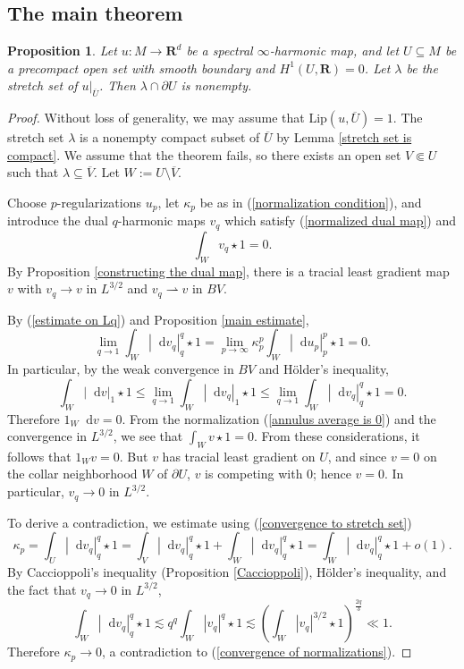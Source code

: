 \documentclass[reqno,11pt]{amsart}
\newcommand{\RR}{\mathbf{R}}
\newcommand*\dif{\mathop{}\!\mathrm{d}}
\newcommand{\Lip}{\mathrm{Lip}}
\newtheorem{proposition}[theorem]{Proposition}
\newcommand{\weakto}{\rightharpoonup}
\theoremstyle{definition}
\numberwithin{equation}{section}
\begin{document}
\subsection{The main theorem}
\begin{proposition}\label{main prop}
Let $u: M \to \RR^d$ be a spectral $\infty$-harmonic map, and let $U \subseteq M$ be a precompact open set with smooth boundary and $H^1(U, \RR) = 0$.
Let $\lambda$ be the stretch set of $u|_{\overline U}$.
Then $\lambda \cap \partial U$ is nonempty.
\end{proposition}
\begin{proof}
Without loss of generality, we may assume that $\Lip(u, \overline U) = 1$.
The stretch set $\lambda$ is a nonempty compact subset of $\overline U$ by Lemma \ref{stretch set is compact}.
We assume that the theorem fails, so there exists an open set $V \Subset U$ such that $\lambda \subseteq \overline V$.
Let $W := U \setminus \overline V$.

Choose $p$-regularizations $u_p$, let $\kappa_p$ be as in (\ref{normalization condition}), and introduce the dual $q$-harmonic maps $v_q$ which satisfy (\ref{normalized dual map}) and 
\begin{equation}\label{annulus average is 0}
\int_W v_q \star 1 = 0.
\end{equation}
By Proposition \ref{constructing the dual map}, there is a tracial least gradient map $v$ with $v_q \to v$ in $L^{3/2}$ and $v_q \weakto v$ in $BV$.

By (\ref{estimate on Lq}) and Proposition \ref{main estimate},
\begin{equation}\label{convergence to stretch set}
\lim_{q \to 1} \int_W |\dif v_q|_{q}^q \star 1 = \lim_{p \to \infty} \kappa_p^p \int_W |\dif u_p|_{p}^p \star 1 = 0.
\end{equation}
In particular, by the weak convergence in $BV$ and H\"older's inequality, 
$$\int_W |\dif v|_1 \star 1 \leq \lim_{q \to 1} \int_W |\dif v_q|_1 \star 1 \leq \lim_{q \to 1} \int_W |\dif v_q|_q^q \star 1 = 0.$$
Therefore $1_W \dif v = 0$.
From the normalization (\ref{annulus average is 0}) and the convergence in $L^{3/2}$, we see that $\int_W v \star 1 = 0$.
From these considerations, it follows that $1_W v = 0$.
But $v$ has tracial least gradient on $U$, and since $v = 0$ on the collar neighborhood $W$ of $\partial U$, $v$ is competing with $0$; hence $v = 0$.
In particular, $v_q \to 0$ in $L^{3/2}$.

To derive a contradiction, we estimate using (\ref{convergence to stretch set})
$$\kappa_p = \int_U |\dif v_q|_{q}^q \star 1 = \int_V |\dif v_q|_{q}^q \star 1 + \int_W |\dif v_q|_{q}^q \star 1 = \int_W |\dif v_q|_q^q \star 1 + o(1).$$
By Caccioppoli's inequality (Proposition \ref{Caccioppoli}), H\"older's inequality, and the fact that $v_q \to 0$ in $L^{3/2}$,
$$\int_W |\dif v_q|_q^q \star 1 \lesssim q^q \int_W |v_q|^q \star 1 \lesssim \left(\int_W |v_q|^{3/2} \star 1\right)^{\frac{2q}{3}} \ll 1.$$
Therefore $\kappa_p \to 0$, a contradiction to (\ref{convergence of normalizations}).
\end{proof}
\end{document}
